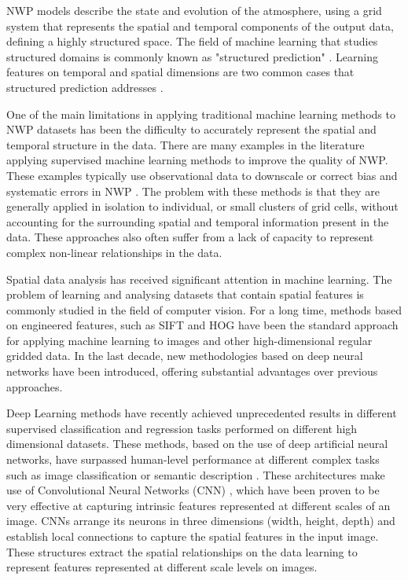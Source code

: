 \documentclass[twocol]{ametsoc}
\begin{document}
NWP models describe the state and evolution of the atmosphere, using a grid system that represents the spatial and temporal components of the output data, defining a highly structured space. The field of machine learning that studies structured domains is commonly known as "structured prediction" \citep{taskar2005learning}. Learning features on temporal and spatial dimensions are two common cases that structured prediction addresses \citep{gupta2010estimating,tran2012max}.

One of the main limitations in applying traditional machine learning methods to NWP datasets has been the difficulty to accurately represent the spatial and temporal structure in the data. There are many examples in the literature applying supervised machine learning methods to improve the quality of NWP. These examples typically use observational data to downscale or correct bias and systematic errors in NWP \citep{loridan2017machine,gagne2014machine,foley2012current,rozas2014method}. The problem with these methods is that they are generally applied in isolation to individual, or small clusters of grid cells, without accounting for the surrounding spatial and temporal information present in the data. These approaches also often suffer from a lack of capacity to represent complex non-linear relationships in the data. 

Spatial data analysis has received significant attention in machine learning. The problem of learning and analysing datasets that contain spatial features is commonly studied in the field of computer vision. For a long time, methods based on engineered features, such as SIFT \citep{lowe2004distinctive} and HOG \citep{dalal2005histograms} have been the standard approach for applying machine learning to images and other high-dimensional regular gridded data. In the last decade, new methodologies based on deep neural networks have been introduced, offering substantial advantages over previous approaches. 

Deep Learning \citep{lecun2015deep} methods have recently achieved unprecedented results in different supervised classification and regression tasks performed on different high dimensional datasets. These methods, based on the use of deep artificial neural networks, have surpassed human-level performance at different complex tasks such as image classification \citep{krizhevsky2012imagenet} or semantic description \citep{karpathy2015deep}. These architectures make use of Convolutional Neural Networks (CNN) \citep{krizhevsky2012imagenet}, which have been proven to be very effective at capturing intrinsic features represented at different scales of an image. CNNs arrange its neurons in three dimensions (width, height, depth) and establish local connections to capture the spatial features in the input image. These structures extract the spatial relationships on the data learning to represent features represented at different scale levels on images.
\end{document}
